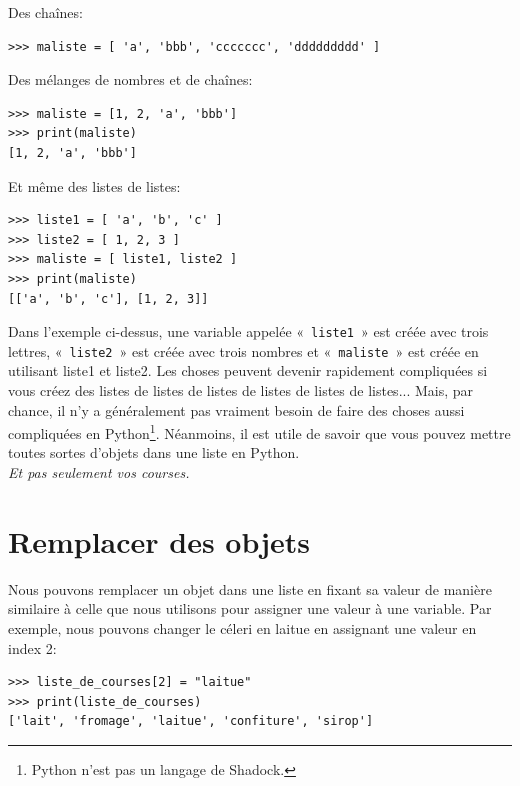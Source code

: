 Des chaînes:

\begin{Verbatim}[frame=single,rulecolor=\color{mbleu}, label=à taper]
>>> maliste = [ 'a', 'bbb', 'ccccccc', 'ddddddddd' ]
\end{Verbatim}

Des mélanges de nombres et de chaînes:

\begin{Verbatim}[frame=single,rulecolor=\color{mbleu}, label=à taper]
>>> maliste = [1, 2, 'a', 'bbb']
>>> print(maliste)
[1, 2, 'a', 'bbb']
\end{Verbatim}


Et même des listes de listes:

\begin{Verbatim}[frame=single,rulecolor=\color{mbleu}, label=à taper]
>>> liste1 = [ 'a', 'b', 'c' ]
>>> liste2 = [ 1, 2, 3 ]
>>> maliste = [ liste1, liste2 ]
>>> print(maliste)
[['a', 'b', 'c'], [1, 2, 3]]
\end{Verbatim}

Dans l'exemple ci-dessus, une variable appelée «~\texttt{liste1}~» est créée avec trois lettres, «~\texttt{liste2}~» est créée avec trois nombres et «~\texttt{maliste}~» est créée en utilisant liste1 et liste2. 
Les choses peuvent devenir rapidement compliquées si vous créez des listes de listes de listes de listes de listes de listes... Mais, par chance, il n'y a généralement pas vraiment besoin de faire des choses  aussi compliquées en Python\footnote{Python n'est pas un langage de Shadock.}. Néanmoins, il est utile de savoir que vous pouvez mettre toutes sortes d'objets dans une liste en Python.\\

\emph{Et pas seulement vos courses.}\\

\section*{Remplacer des objets}

Nous pouvons remplacer un objet dans une liste en fixant sa valeur de manière similaire à celle que nous utilisons pour assigner une valeur à une variable. Par exemple, nous pouvons changer le céleri en laitue en assignant une valeur en index 2:\\

\begin{Verbatim}[frame=single,rulecolor=\color{mbleu}, label=à taper]
>>> liste_de_courses[2] = "laitue"
>>> print(liste_de_courses)
['lait', 'fromage', 'laitue', 'confiture', 'sirop']
\end{Verbatim}

